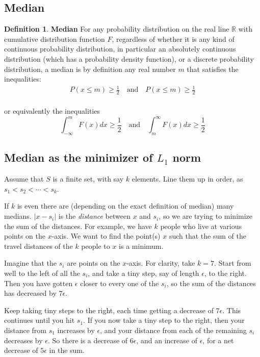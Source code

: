 \documentclass[12pt, letterpaper]{article}
\theoremstyle{definition}
\newtheorem{definition}{Definition}[section]
\newcommand{\R}{\mathbb{R}}
\begin{document}
\subsection{Median}
\begin{definition}{\textbf{Median}}
For any probability distribution on the real line $\R$ with cumulative distribution function $F$, regardless of whether it is any kind of continuous probability distribution, in particular an absolutely continuous distribution (which has a probability density function), or a discrete probability distribution, a median is by definition any real number $m$ that satisfies the inequalities:
\begin{align}
P(x\le m) \ge \frac{1}{2} \quad \text{and} \quad P(x\le m) \ge \frac{1}{2}\\
\end{align}

or equivalently the inequalities
\begin{equation}
\int_{- \infty}^{m} F(x) dx \ge  \frac{1}{2} \quad \text{and} \quad \int_{m}^{\infty} F(x) dx \ge  \frac{1}{2} 
\end{equation}
\end{definition}

\subsection{Median as the minimizer of $L_1$ norm}
\label{medianMin}
Assume that $S$ is a finite set, with say $k$ elements. Line them up in order, as $s_1<s_2<\cdots <s_k$.  

If $k$ is even there are (depending on the exact definition of median) many medians. $|x-s_i|$ is the \textit{distance} between $x$ and $s_i$, so we are trying to minimize the sum of the distances. For example, we have $k$ people who live at various points on the $x$-axis. We want to find the point(s) $x$ such that the sum of the travel distances of the $k$ people to $x$ is a minimum.

Imagine that the $s_i$ are points on the $x$-axis. For clarity, take $k=7$. Start from well to the left of all the $s_i$, and take a tiny step, say of length $\epsilon$, to the right. Then you have gotten $\epsilon$ closer to every one of the $s_i$, so the sum of the distances has decreased by $7\epsilon$. 

Keep taking tiny steps to the right, each time getting a decrease of $7\epsilon$. This continues until you hit $s_1$. If you now take a tiny step to the right, then your distance from $s_1$ increases by $\epsilon$, and your distance from each of the remaining $s_i$  decreases by $\epsilon$. So there is a decrease of $6\epsilon$, and an increase of $\epsilon$, for a net decrease of $5\epsilon$ in the sum. 
\end{document}
